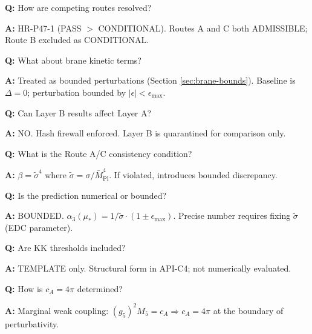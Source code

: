 \documentclass[11pt,a4paper]{article}
\theoremstyle{definition}
\begin{document}
\begin{trapbox}
\textbf{Q:} How are competing routes resolved?

\textbf{A:} HR-P47-1 (PASS $>$ CONDITIONAL). Routes A and C both ADMISSIBLE;
Route B excluded as CONDITIONAL.
\end{trapbox}

\begin{trapbox}
\textbf{Q:} What about brane kinetic terms?

\textbf{A:} Treated as bounded perturbations (Section \ref{sec:brane-bounds}).
Baseline is $\Delta = 0$; perturbation bounded by $|\epsilon| < \epsilon_{\max}$.
\end{trapbox}

\begin{trapbox}
\textbf{Q:} Can Layer B results affect Layer A?

\textbf{A:} NO. Hash firewall enforced. Layer B is quarantined for comparison only.
\end{trapbox}

\begin{trapbox}
\textbf{Q:} What is the Route A/C consistency condition?

\textbf{A:} $\beta = \tilde{\sigma}^4$ where $\tilde{\sigma} = \sigma/\bar{M}_{\text{Pl}}^4$.
If violated, introduces bounded discrepancy.
\end{trapbox}

\begin{trapbox}
\textbf{Q:} Is the prediction numerical or bounded?

\textbf{A:} BOUNDED. $\alpha_3(\mu_*) = 1/\tilde{\sigma} \cdot (1 \pm \epsilon_{\max})$.
Precise number requires fixing $\tilde{\sigma}$ (EDC parameter).
\end{trapbox}

\begin{trapbox}
\textbf{Q:} Are KK thresholds included?

\textbf{A:} TEMPLATE only. Structural form in API-C4; not numerically evaluated.
\end{trapbox}

\begin{trapbox}
\textbf{Q:} How is $c_A = 4\pi$ determined?

\textbf{A:} Marginal weak coupling: $(g_5)^2 M_5 = c_A \Rightarrow c_A = 4\pi$
at the boundary of perturbativity.
\end{trapbox}
\end{document}
